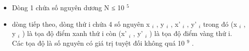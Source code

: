 \begin{itemize}
	\item     Dòng 1 chứa số nguyên dương N ≤ 10    $^     5    $
	\item     dòng tiếp theo, dòng thứ i chứa 4 số nguyên x    $_     i    $    , y    $_     i    $    , x'    $_     i    $    , y'    $_     i    $    trong đó (x    $_     i    $    , y    $_     i    $    ) là tọa độ điểm xanh thứ i còn (x'    $_     i    $    , y'    $_     i    $    ) là tọa độ điểm vàng thứ i. Các tọa độ là số nguyên có giá trị tuyệt đối không quá 10    $^     9    $    .   
\end{itemize}

\
